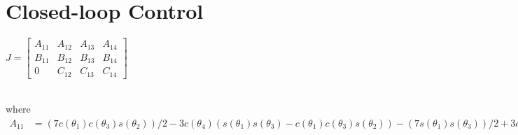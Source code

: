 \documentclass[11pt]{article}
\begin{document}
\section{Closed-loop Control}
\begin{center}
$
\begin{equation}
J
= 
\begin{bmatrix}
A_{11} & A_{12} & A_{13} & A_{14} \\
B_{11} & B_{12} & B_{13} & B_{14} \\
     0 & C_{12} & C_{13} & C_{14}
\end{bmatrix}
\end{equation}
$ 
\end{center} \\
where
$
\begin{align*}
A_{11} &= (7c(\theta_1)c(\theta_3) s(\theta_2))/2 - 3 c(\theta_4) (s(\theta_1) s(\theta_3) - c(\theta_1) c(\theta_3) s(\theta_2)) - (7 s(\theta_1) s(\theta_3))/2 + 3 c(\theta_1) c(\theta_2) s(\theta_4)

A_{12} &= (7 c(\theta_2) c(\theta_3) s(\theta_1))/2 - 3 s(\theta_1) s(\theta_2) s(\theta_4) + 3 c(\theta_2) c(\theta_3) c(\theta_4) s(\theta_1)

A_{13} &= (7 c(\theta_1) c(\theta_3))/2 + 3 c(\theta_4) (c(\theta_1) c(\theta_3) - s(\theta_1) s(\theta_2) s(\theta_3)) - (7 s(\theta_1) s(\theta_2) s(\theta_3))/2

A_{14} &= 3 c(\theta_2) c(\theta_4) s(\theta_1) - 3 s(\theta_4) (c(\theta_1) s(\theta_3) + c(\theta_3) s(\theta_1) s(\theta_2))

B_{11} &= (7 c(\theta_1) s(\theta_3))/2 + 3 c(\theta_4) (c(\theta_1) s(\theta_3) + c(\theta_3) s(\theta_1) s(\theta_2)) + (7 c(\theta_3) s(\theta_1) s(\theta_2))/2 + 3 c(\theta_2) s(\theta_1) s(\theta_4)

B_{12} &= 3 c(\theta_1) s(\theta_2) s(\theta_4) - (7 c(\theta_1) c(\theta_2) c(\theta_3))/2 - 3 c(\theta_1) c(\theta_2) c(\theta_3) c(\theta_4)

B_{13} &= (7 c(\theta_3) s(\theta_1))/2 + 3 c(\theta_4) (c(\theta_3) s(\theta_1) + c(\theta_1) s(\theta_2) s(\theta_3)) + (7 c(\theta_1) s(\theta_2) s(\theta_3))/2

B_{14} &= - 3 s(\theta_4) (s(\theta_1) s(\theta_3) - c(\theta_1) c(\theta_3) s(\theta_2)) - 3 c(\theta_1) c(\theta_2) c(\theta_4)

C_{12} &= - (7 c(\theta_3) s(\theta_2))/2 - 3 c(\theta_2) s(\theta_4) - 3 c(\theta_3) c(\theta_4) s(\theta_2)

C_{13} &= - (7 c(\theta_2) s(\theta_3))/2 - 3 c(\theta_2) c(\theta_4) s(\theta_3)

C_{14} &= - 3 c(\theta_4) s(\theta_2) - 3 c(\theta_2) c(\theta_3) s(\theta_4)
\end{align*}
$
\end{document}
